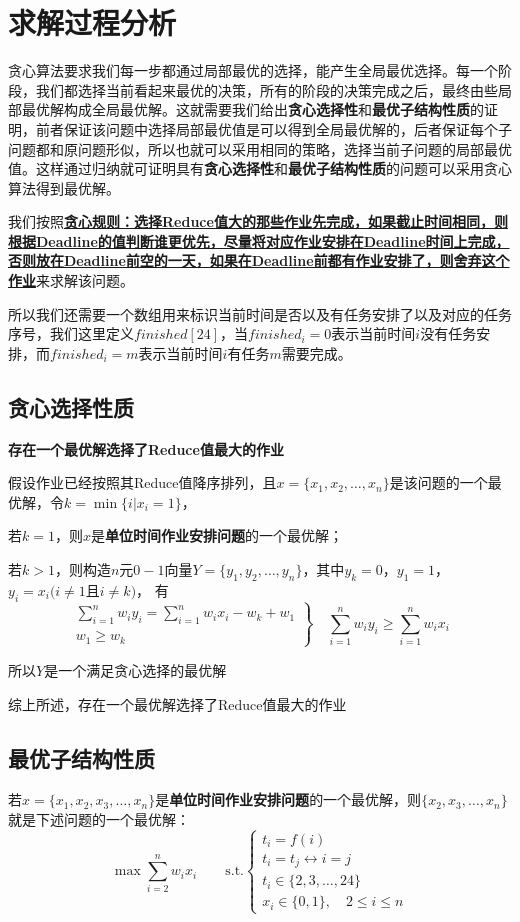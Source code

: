 \documentclass[11pt]{ctexart}
\begin{document}
\section{求解过程分析}
贪心算法要求我们每一步都通过局部最优的选择，能产生全局最优选择。每一个阶段，我们都选择当前看起来最优的决策，所有的阶段的决策完成之后，最终由些局部最优解构成全局最优解。这就需要我们给出\textbf{贪心选择性}和\textbf{最优子结构性质}的证明，前者保证该问题中选择局部最优值是可以得到全局最优解的，后者保证每个子问题都和原问题形似，所以也就可以采用相同的策略，选择当前子问题的局部最优值。这样通过归纳就可证明具有\textbf{贪心选择性}和\textbf{最优子结构性质}的问题可以采用贪心算法得到最优解。

我们按照\textbf{\uline{贪心规则：选择Reduce值大的那些作业先完成，如果截止时间相同，则根据Deadline的值判断谁更优先，尽量将对应作业安排在Deadline时间上完成，否则放在Deadline前空的一天，如果在Deadline前都有作业安排了，则舍弃这个作业}}来求解该问题。

所以我们还需要一个数组用来标识当前时间是否以及有任务安排了以及对应的任务序号，我们这里定义$finished[24]$，当$finished_i=0$表示当前时间$i$没有任务安排，而$finished_i=m$表示当前时间$i$有任务$m$需要完成。


\subsection{贪心选择性质}
\textbf{存在一个最优解选择了Reduce值最大的作业}

假设作业已经按照其Reduce值降序排列，且$x=\{x_1, x_2, \dots ,x_n\}$是该问题的一个最优解，令$k=\min\{i|x_i=1\}$，

若$k=1$，则$x$是\textbf{单位时间作业安排问题}的一个最优解；

若$k>1$，则构造$n$元$0-1$向量$Y=\{y_1, y_2,\dots , y_n\}$，其中$y_k=0$，$y_1=1$，$y_i=x_i(i\neq 1$且$i\neq k)$， 有
\begin{equation*}
    \left.\begin{array}{r}
        \sum_{i=1}^{n}w_i y_i = \sum_{i=1}^{n}w_i x_i-w_k+w_1\\
        w_1 \geqslant w_k
    \end{array}\right\}
    \quad \sum_{i=1}^{n}w_i y_i \geqslant \sum_{i=1}^{n}w_i x_i
\end{equation*}

所以$Y$是一个满足贪心选择的最优解

综上所述，存在一个最优解选择了Reduce值最大的作业

\subsection{最优子结构性质}
若$x=\{x_1, x_2, x_3,\dots ,x_n\}$是\textbf{单位时间作业安排问题}的一个最优解，则$\{x_2, x_3,\dots ,x_n\}$就是下述问题的一个最优解：
$$
\max{ \sum_{i=2}^{n}w_i x_i} \qquad \text{s.t.} 
\left\{\begin{array}{cc}
    t_i = f(i)\\
    t_i = t_j \leftrightarrow i=j \\
    t_i\in \{2,3,\dots,24\}\\
    x_i \in \{0,1\},\quad 2\leqslant i \leqslant n
\end{array}\right.
$$
\end{document}

